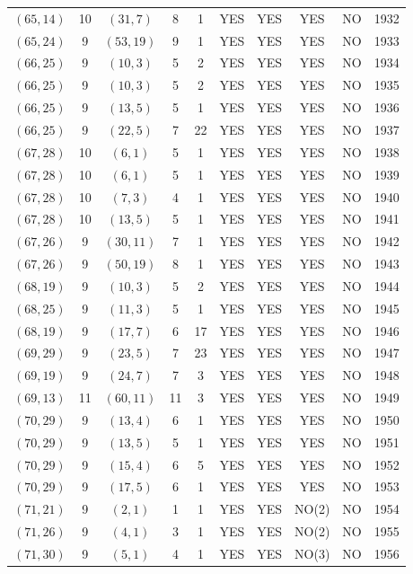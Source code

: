 \begin{longtable}{|c|c|c|c|c|c|c|c|c|c|}
$(65, 14)$ & 10 & $(31, 7)$ & 8 & 1 & YES & YES & YES & NO & 1932\\
$(65, 24)$ & 9 & $(53, 19)$ & 9 & 1 & YES & YES & YES & NO & 1933\\
$(66, 25)$ & 9 & $(10, 3)$ & 5 & 2 & YES & YES & YES & NO & 1934\\
$(66, 25)$ & 9 & $(10, 3)$ & 5 & 2 & YES & YES & YES & NO & 1935\\
$(66, 25)$ & 9 & $(13, 5)$ & 5 & 1 & YES & YES & YES & NO & 1936\\
$(66, 25)$ & 9 & $(22, 5)$ & 7 & 22 & YES & YES & YES & NO & 1937\\
$(67, 28)$ & 10 & $(6, 1)$ & 5 & 1 & YES & YES & YES & NO & 1938\\
$(67, 28)$ & 10 & $(6, 1)$ & 5 & 1 & YES & YES & YES & NO & 1939\\
$(67, 28)$ & 10 & $(7, 3)$ & 4 & 1 & YES & YES & YES & NO & 1940\\
$(67, 28)$ & 10 & $(13, 5)$ & 5 & 1 & YES & YES & YES & NO & 1941\\
$(67, 26)$ & 9 & $(30, 11)$ & 7 & 1 & YES & YES & YES & NO & 1942\\
$(67, 26)$ & 9 & $(50, 19)$ & 8 & 1 & YES & YES & YES & NO & 1943\\
$(68, 19)$ & 9 & $(10, 3)$ & 5 & 2 & YES & YES & YES & NO & 1944\\
$(68, 25)$ & 9 & $(11, 3)$ & 5 & 1 & YES & YES & YES & NO & 1945\\
$(68, 19)$ & 9 & $(17, 7)$ & 6 & 17 & YES & YES & YES & NO & 1946\\
$(69, 29)$ & 9 & $(23, 5)$ & 7 & 23 & YES & YES & YES & NO & 1947\\
$(69, 19)$ & 9 & $(24, 7)$ & 7 & 3 & YES & YES & YES & NO & 1948\\
$(69, 13)$ & 11 & $(60, 11)$ & 11 & 3 & YES & YES & YES & NO & 1949\\
$(70, 29)$ & 9 & $(13, 4)$ & 6 & 1 & YES & YES & YES & NO & 1950\\
$(70, 29)$ & 9 & $(13, 5)$ & 5 & 1 & YES & YES & YES & NO & 1951\\
$(70, 29)$ & 9 & $(15, 4)$ & 6 & 5 & YES & YES & YES & NO & 1952\\
$(70, 29)$ & 9 & $(17, 5)$ & 6 & 1 & YES & YES & YES & NO & 1953\\
$(71, 21)$ & 9 & $(2, 1)$ & 1 & 1 & YES & YES & NO(2) & NO & 1954\\
$(71, 26)$ & 9 & $(4, 1)$ & 3 & 1 & YES & YES & NO(2) & NO & 1955\\
$(71, 30)$ & 9 & $(5, 1)$ & 4 & 1 & YES & YES & NO(3) & NO & 1956\\

\end{longtable}
